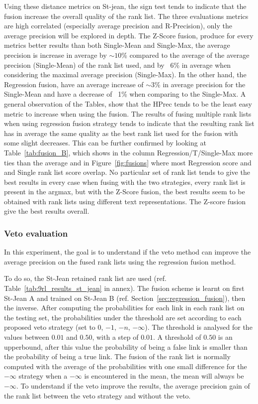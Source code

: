 Using these distance metrics on St-jean, the sign test tends to indicate that the fusion increase the overall quality of the rank list.
The three evaluations metrics are high correlated (especially average precision and R-Precision), only the average precision will be explored in depth.
The Z-Score fusion, produce for every metrics better results than both Single-Mean and Single-Max, the average precision is increase in average by $\sim 10$\% compared to the average of the average precision (Single-Mean) of the rank list used, and by ~6\% in average when considering the maximal average precision (Single-Max).
In the other hand, the Regression fusion, have an average increase of $\sim 3$\% in average precision for the Single-Mean and have a decrease of ~1\% when comparing to the Single-Max.
A general observation of the Tables, show that the HPrec tends to be the least easy metric to increase when using the fusion.
The results of fusing multiple rank lists when using regression fusion strategy tends to indicate that the resulting rank list has in average the same quality as the best rank list used for the fusion with some slight decreases.
This can be further confirmed by looking at Table~\ref{tab:fusion_B}, which shows in the column Regression/T/Single-Max more ties than the average and in Figure~\ref{fig:fusions} where most Regression score and and Single rank list score overlap.
No particular set of rank list tends to give the best results in every case when fusing with the two strategies, every rank list is present in the argmax, but with the Z-Score fusion, the best results seem to be obtained with rank lists using different text representations.
The Z-score fusion give the best results overall.

\subsubsection{Veto evaluation}

In this experiment, the goal is to understand if the veto method can improve the average precision on the fused rank lists using the regression fusion method.

To do so, the St-Jean retained rank list are used (ref. Table~\ref{tab:9rl_results_st_jean} in annex).
The fusion scheme is learnt on first St-Jean A and trained on St-Jean B (ref. Section~\ref{sec:regression_fusion}), then the inverse.
After computing the probabilities for each link in each rank list on the testing set, the probabilities under the threshold are set according to each proposed veto strategy (set to $0$, $-1$, $-n$, $-\infty$).
The threshold is analysed for the values between $0.01$ and $0.50$, with a step of $0.01$.
A threshold of $0.50$ is an upperbound, after this value the probability of being a false link is smaller than the probability of being a true link.
The fusion of the rank list is normally computed with the average of the probabilities with one small difference for the $-\infty$ strategy when a $-\infty$ is encountered in the mean, the mean will always be $-\infty$.
To understand if the veto improve the results, the average precision gain of the rank list between the veto strategy and without the veto.

